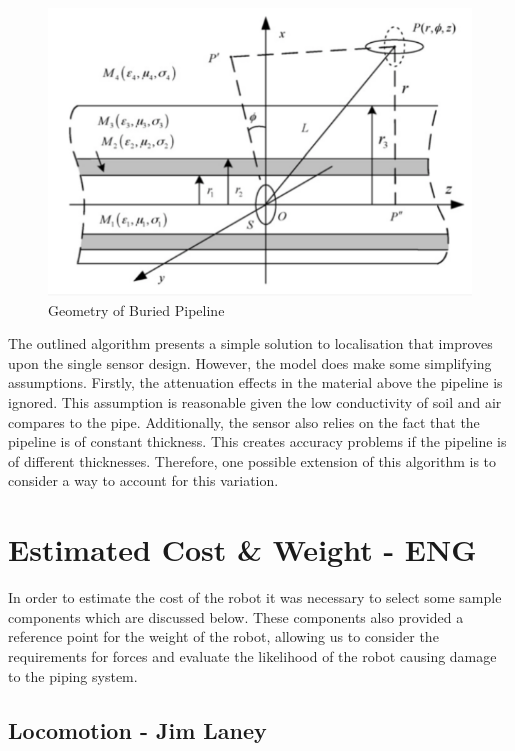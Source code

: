 \documentclass[11pt]{article}		%
\begin{document}
		\begin{figure}[h]
			\centering
			\includegraphics[scale=1]{localisation.pdf}
			\caption{Geometry of Buried Pipeline}
			\label{localisation}
		\end{figure}
		
		The outlined algorithm presents a simple solution to localisation that improves upon the single sensor design. However, the model does make some simplifying assumptions. Firstly, the attenuation effects in the material above the pipeline is ignored. This assumption is reasonable given the low conductivity of soil and air compares to the pipe. Additionally, the sensor also relies on the fact that the pipeline is of constant thickness. This creates accuracy problems if the pipeline is of different thicknesses. Therefore, one possible extension of this algorithm is to consider a way to account for this variation. 
		
		
		
		
		
	\section{Estimated Cost \& Weight - ENG}
		
		In order to estimate the cost of the robot it was necessary to select some sample components which are discussed below.
		These components also provided a reference point for the weight of the robot, allowing us to consider the requirements for forces and evaluate the likelihood of the robot causing damage to the piping system.
		
		\subsection[Locomotion]{Locomotion - Jim Laney}
		
\end{document}
